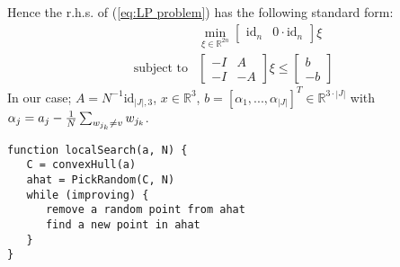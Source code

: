 \documentclass[10pt,a4paper]{article}
\newcommand{\R}{\mathbb{R}}
\newcommand{\id}{\text{id}}
\begin{document}
	Hence the r.h.s. of (\ref{eq:LP problem}) has the following standard form:
	\begin{align*}
	&\min_{\xi \in \R^{2n}} \begin{bmatrix}
	\id_{n} & 0 \cdot \id_{n}
	\end{bmatrix} \xi\\
	\text{subject to}& \begin{bmatrix}
	-I & A\\
	-I & -A
	\end{bmatrix} 
	\xi \leq 
	\begin{bmatrix}
	b\\
	-b
	\end{bmatrix}
	\end{align*}
	In our case; $A = N^{-1} \text{id}_{|J|,3}$, $x \in \R^3$, $b = [\alpha_1, ..., \alpha_{|J|}]^T \in \R^{3\cdot |J|}$ with $\alpha_j = a_j - {1 \over N} \sum_{w_{j_k} \neq v} w_{j_k}$.
	\begin{lstlisting}[caption={A algorithm to find a local solution},basicstyle=\small]
function localSearch(a, N) {
   C = convexHull(a)
   ahat = PickRandom(C, N)
   while (improving) {
      remove a random point from ahat
      find a new point in ahat
   }
}
	\end{lstlisting}
	
\end{document}

